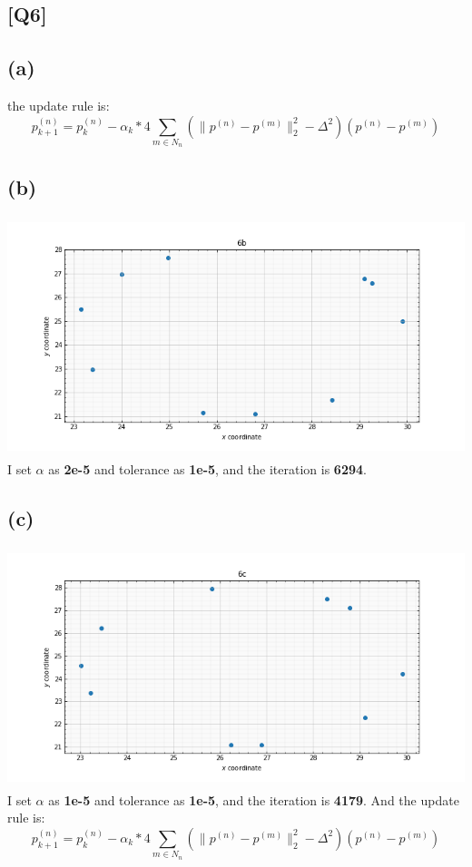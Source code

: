 \documentclass[12pt, a4 paper]{article}
\begin{document}
    \begin{framed}
        \section{[Q6]}
        \subsection{(a)}
        the update rule is:
        $$
        p_{k+1}^{(n)} = p_{k}^{(n)} - \alpha_{k} * 4
        \sum\limits_{m\in N_{n}} (\lVert p^{(n)}-p^{(m)} \rVert_{2}^{2}-\Delta^{2})
        (p^{(n)}-p^{(m)})
        $$

        \subsection{(b)}
        {\centering
        \includegraphics[width=14cm, height=7cm]{6b.png}
        }
        I set $\alpha$ as \textbf{2e-5} and tolerance as
        \textbf{1e-5}, and the iteration
         is \textbf{6294}.

        \subsection{(c)}
        {\centering
        \includegraphics[width=14cm, height=7cm]{6c.png}
        }
        I set $\alpha$ as \textbf{1e-5} and tolerance as 
        \textbf{1e-5}, and the iteration is \textbf{4179}.
        And the update rule is:
        $$
        p_{k+1}^{(n)} = p_{k}^{(n)} - \alpha_{k} * 4
        \sum\limits_{m\in N_{n}} (\lVert p^{(n)}-p^{(m)} \rVert_{2}^{2}-\Delta^{2})
        (p^{(n)}-p^{(m)})
        $$


\end{framed}
\end{document}
